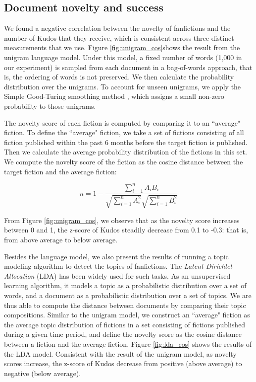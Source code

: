 \documentclass[a4paper]{article}
\begin{document}
\subsection*{Document novelty and success}
We found a negative correlation between the novelty of fanfictions and the number of Kudos that they receive, which is consistent across three distinct measurements that we use.  Figure \ref{fig:unigram_cos}shows the result from the unigram language model. Under this model, a fixed number of words (1,000 in our experiment) is sampled from each document in a bag-of-words approach, that is, the ordering of words is not preserved. We then calculate the probability distribution over the unigrams. To account for unseen unigrams, we apply the Simple Good-Turing smoothing method \cite{gales1995good}, which assigns a small non-zero probability to those unigrams. 

The novelty score of each fiction is computed by comparing it to an ``average" fiction. To define the ``average" fiction, we take a set of fictions consisting of all fiction published within the past 6 months before the target fiction is published. Then we calculate the average probability distribution of the fictions in this set. We compute the novelty score of the fiction as the cosine distance between the target fiction and the average fiction:

\begin{equation}
n = 1-\frac{\sum_{i=1}^{n}{A_iB_i}}{\sqrt{\sum_{i=1}^{n}{A_i^2}}\sqrt{\sum_{i=1}^{n}{B_i^2}}}
\end{equation}

From Figure \ref{fig:unigram_cos}, we observe that as the novelty score increases between 0 and 1, the z-score of Kudos steadily decrease from 0.1 to -0.3: that is, from above average to below average. 

Besides the language model, we also present the results of running a topic modeling algorithm to detect the topics of fanfictions. 
The  \emph{Latent Dirichlet Allocation} (LDA) \cite{blei2003latent} has been widely used for such tasks. As an unsupervised learning algorithm, it models a topic as a probabilistic distribution over a set of words, and a document as a probabilistic distribution over a set of topics. We are thus able to compute the distance between documents by comparing their topic compositions. Similar to the unigram model, we construct an ``average" fiction as the average topic distribution of fictions in a set consisting of fictions published during a given time period, and define the novelty score as the cosine distance between a fiction and the average fiction. Figure \ref{fig:lda_cos} shows the results of the LDA model. Consistent with the result of the unigram model, as novelty scores increase, the z-score of Kudos decrease from positive (above average) to negative (below average).
\end{document}

